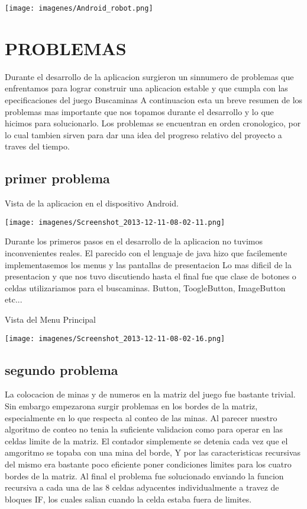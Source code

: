 \documentclass[11pt]{article} %
\begin{document}
\texttt{[image: imagenes/Android\_robot.png]}
\section{PROBLEMAS }

Durante el desarrollo de la aplicacion surgieron un sinnumero de problemas que enfrentamos para lograr construir una aplicacion estable y que cumpla con las epecificaciones del juego Buscaminas
A continuacion esta un breve resumen de los problemas mas importante que nos topamos durante el desarrollo  y lo que hicimos para solucionarlo.
Los problemas se encuentran en orden cronologico, por lo cual tambien sirven para dar una idea del progreso relativo del proyecto a traves del tiempo.

\subsection{primer problema}
\begin{center}
Vista de la aplicacion en el dispositivo Android. 

\texttt{[image: imagenes/Screenshot\_2013-12-11-08-02-11.png]}
\end{center}

Durante los primeros pasos en el desarrollo de la aplicacion no tuvimos inconvenientes reales. El parecido con el lenguaje de java hizo que facilemente implementasemos los menus y las pantallas de presentacion
Lo mas dificil de la presentacion y que nos tuvo discutiendo hasta el final fue que clase de botones o celdas utilizariamos para el buscaminas. Button, ToogleButton, ImageButton etc...

\begin{center}
Vista del Menu Principal

\texttt{[image: imagenes/Screenshot\_2013-12-11-08-02-16.png]}
\end{center}

\subsection{segundo problema}

La colocacion de minas y de numeros en la matriz del juego fue bastante trivial. Sin embargo empezarona  surgir problemas en los bordes de la matriz, especialmente en lo que respecta al conteo de las minas.
Al parecer nuestro algoritmo de conteo no tenia la suficiente validacion como para operar en las celdas limite de la matriz. El contador simplemente se detenia cada vez que el amgoritmo se topaba con una mina del borde, Y por las caracteristicas recursivas del mismo era bastante poco eficiente poner condiciones limites para los cuatro bordes de la matriz. Al final el problema fue solucionado enviando la funcion recursiva a cada una de las 8 celdas adyacentes individualmente a travez de bloques IF, los cuales salian cuando la celda estaba fuera de limites.
\end{document}
